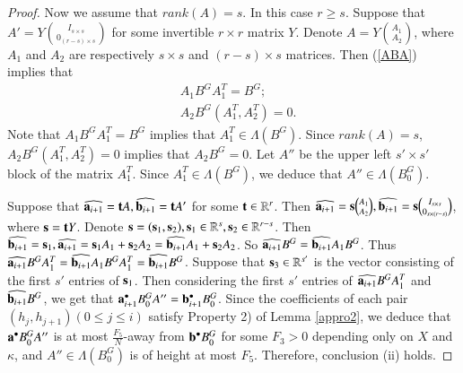 \documentclass[12pt,amstex]{amsart}
\theoremstyle{definition}
\def \D {\kappa}
\def \a {\bold{a}}
\def \b {\bold{b}}
\begin{document}
\begin{proof}
Now we assume that $rank(A)=s$. In this case $r\geq s$. Suppose that $A'=Y\binom{I_{s\times s}}{0_{(r-s)\times s}}$ for some
invertible $r\times r$ matrix $Y$. Denote $A=Y\binom{A_{1}}{A_{2}}$, where $A_{1}$ and $A_{2}$ are respectively $s\times s$ and $(r-s)\times s$ matrices.
Then (\ref{ABA}) implies that
\begin{equation}\nonumber
 \begin{split}
  & A_{1}B^{G}A_{1}^{T}=B^{G};
  \\& A_{2}B^{G}(A_{1}^{T},A_{2}^{T})=0.
 \end{split}
\end{equation}
Note that $A_{1}B^{G}A_{1}^{T}=B^{G}$ implies that $A_{1}^{T}\in\Lambda(B^{G})$. Since $rank(A)=s$, $A_{2}B^{G}(A_{1}^{T},A_{2}^{T})=0$ implies that $A_{2}B^{G}=0$. Let $A''$ be the upper left $s'\times s'$ block of the matrix $A_{1}^{T}$. Since $A_{1}^{T}\in\Lambda(B^{G})$, we deduce that $A''\in\Lambda(B_{0}^{G})$.

Suppose that $\widehat{\a_{i+1}}=\bold{t}A, \widehat{\b_{i+1}}=\bold{t}A'$ for some $\bold{t}\in\mathbb{R}^{r}$. Then
$\widehat{\a_{i+1}}=\bold{s}\binom{A_{1}}{A_{2}}, \widehat{\b_{i+1}}=\bold{s}\binom{I_{s\times s}}{0_{s\times (r-s)}}$, where $\bold{s}=\bold{t}Y$. Denote $\bold{s}=(\bold{s}_{1},\bold{s}_{2}), \bold{s}_{1}\in\mathbb{R}^{s}, \bold{s}_{2}\in\mathbb{R}^{r-s}$.
Then $\widehat{\b_{i+1}}=\bold{s}_{1}, \widehat{\a_{i+1}}=\bold{s}_{1}A_{1}+\bold{s}_{2}A_{2}=\widehat{\b_{i+1}}A_{1}+\bold{s}_{2}A_{2}$. So $\widehat{\a_{i+1}}B^{G}=\widehat{\b_{i+1}}A_{1}B^{G}$.
Thus
$\widehat{\a_{i+1}}B^{G}A_{1}^{T}=\widehat{\b_{i+1}}A_{1}B^{G}A_{1}^{T}= \widehat{\b_{i+1}}B^{G}$.
Suppose that $\bold{s}_{3}\in\mathbb{R}^{s'}$ is the vector consisting of the first $s'$ entries of $\bold{s}_{1}$. Then
considering the first $s'$ entries of $\widehat{\a_{i+1}}B^{G}A_{1}^{T}$ and $\widehat{\b_{i+1}}B^{G}$, we get that
$\a_{i+1}^{\bullet}B_{0}^{G}A''=\b_{i+1}^{\bullet}B_{0}^{G}$.
Since the coefficients of each pair $(h_{j},h_{j+1}) (0\leq j\leq i)$ satisfy Property 2) of Lemma \ref{appro2}, we
deduce that $\a^{\bullet}B_{0}^{G}A''$ is at most $\frac{F_{5}}{N}$-away from $\b^{\bullet}B_{0}^{G}$ for some $F_{3}>0$ depending only on $X$ and $\D$, and $A''\in\Lambda(B_{0}^{G})$ is of height at most $F_{5}$. Therefore, conclusion
(ii) holds.
\end{proof}
\end{document}
